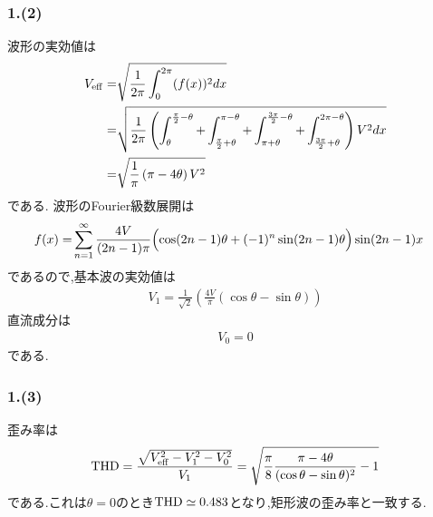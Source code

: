 \subsubsection*{1.(2)}
波形の実効値は
\begin{align*}
  V_{\rm eff}=&\sqrt{\frac{1}{2\pi}\int_0^{2\pi}(f(x))^2dx}\\
  =&\sqrt{\frac{1}{2\pi}\left(\int_\theta^{\frac{\pi}{2}-\theta}+\int_{\frac{\pi}{2}+\theta}^{\pi-\theta}+\int_{\pi+\theta}^{\frac{3\pi}{2}-\theta}+\int_{\frac{3\pi}{2}+\theta}^{2\pi-\theta}\right)V^2dx}\\
  =&\sqrt{\frac{1}{\pi}\left(\pi-4\theta\right)V^2}
\end{align*}
である.
波形のFourier級数展開は
\begin{align*}
  f(x)=&\sum_{n=1}^\infty\frac{4V}{(2n-1)\pi}\Bigl(\cos(2n-1)\theta+(-1)^{n}\sin(2n-1)\theta\Bigr)\sin(2n-1)x
\end{align*}
であるので,基本波の実効値は
\begin{align*}
  V_1=\frac{1}{\sqrt{2}}\left(\frac{4V}{\pi}\left(\cos\theta-\sin\theta\right)\right)
\end{align*}
直流成分は
\begin{align*}
  V_0=0
\end{align*}
である.
\subsubsection*{1.(3)}
歪み率は
\begin{align*}
  {\rm  THD}=\frac{\sqrt{V_{\rm eff}^2-V_1^2-V_0^2}}{V_1}=\sqrt{\frac{\pi}{8}\frac{\pi-4\theta}{(\cos\theta-\sin\theta)^2}-1}
\end{align*}
である.これは$\theta=0$のとき${\rm THD}\simeq0.483$となり,矩形波の歪み率と一致する.